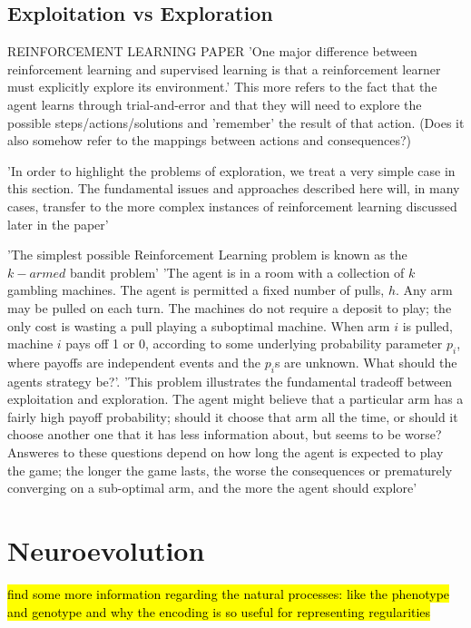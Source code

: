 \subsection{Exploitation vs Exploration} REINFORCEMENT LEARNING PAPER \cite{KaelblingLittmanMoore1996}
'One major difference between reinforcement learning and supervised learning is that a reinforcement learner must explicitly explore its environment.' \cite{KaelblingLittmanMoore1996}
This more refers to the fact that the agent learns through trial-and-error and that they will need to explore the possible steps/actions/solutions and 'remember' the result of that action. (Does it also somehow refer to the mappings between actions and consequences?)

'In order to highlight the problems of exploration, we treat a very simple case in this section. The fundamental issues and approaches described here will, in many cases, transfer to the more complex instances of reinforcement learning discussed later in the paper' \cite{KaelblingLittmanMoore1996}

'The simplest possible Reinforcement Learning problem is known as the $k-armed$ bandit problem' \cite{KaelblingLittmanMoore1996}
'The agent is in a room with a collection of $k$ gambling machines. The agent is permitted a fixed number of pulls, $h$. Any arm may be pulled on each turn. The machines do not require a deposit to play; the only cost is wasting a pull playing a suboptimal machine. When arm $i$ is pulled, machine $i$ pays off 1 or 0, according to some underlying probability parameter $p_i$, where payoffs are independent events and the $p_i$s are unknown. What should the agents strategy be?'\cite{KaelblingLittmanMoore1996}.
'This problem illustrates the fundamental tradeoff between exploitation and exploration. The agent might believe that a particular arm has a fairly high payoff probability; should it choose that arm all the time, or should it choose another one that it has less information about, but seems to be worse? Answeres to these questions depend on how long the agent is expected to play the game; the longer the game lasts, the worse the consequences or prematurely converging on a sub-optimal arm, and the more the agent should explore'



\section{Neuroevolution}

\hl{find some more information regarding the natural processes: like the phenotype and genotype and why the encoding is so useful for representing regularities}

